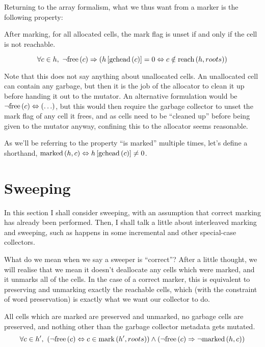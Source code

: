 Returning to the array formalism, what we thus want from a marker is
the following property:

\begin{definition}
  \label{def:ms-correct-marking}
  After marking, for all allocated cells, the mark flag is unset if
  and only if the cell is not reachable.

  \[\forall c \in h,\ \lnot\mathrm{free}\left(c\right) \Rightarrow
  \left(h\left[\mathrm{gchead}\left(c\right)\right] = 0 \Leftrightarrow c \notin
    \mathrm{reach}\left(h, roots\right)\right)\]
\end{definition}

Note that this does not say anything about unallocated cells. An
unallocated cell can contain any garbage, but then it is the job of
the allocator to clean it up before handing it out to the mutator. An
alternative formulation would be $\lnot\mathrm{free}\left(c\right) \Leftrightarrow
\left(\ldots\right)$, but this would then require the garbage
collector to unset the mark flag of any cell it frees, and as cells
need to be ``cleaned up'' before being given to the mutator anyway,
confining this to the allocator seems reasonable.

As we'll be referring to the property ``is marked'' multiple times,
let's define a shorthand, $\mathrm{marked}\left(h, c\right) \Leftrightarrow h\left[\mathrm{gchead}\left(c\right)\right]
\neq 0$.

\section{Sweeping}
\label{sec:marksweep-sweeping}

In this section I shall consider sweeping, with an assumption that
correct marking has already been performed. Then, I shall talk a
little about interleaved marking and sweeping, such as happens in some
incremental and other special-case collectors.

What do we mean when we say a sweeper is ``correct''? After a little
thought, we will realise that we mean it doesn't deallocate any cells
which were marked, and it unmarks all of the cells. In the case of a
correct marker, this is equivalent to preserving and unmarking exactly
the reachable cells, which (with the constraint of word preservation)
is exactly what we want our collector to do.

\begin{definition}
  \label{def:ms-correct-sweeping}
  All cells which are marked are preserved and unmarked, no garbage
  cells are preserved, and nothing other than the garbage collector
  metadata gets mutated.
  \[\forall c \in h',\ \left(\lnot\mathrm{free}\left(c\right) \Leftrightarrow c \in
    \mathrm{mark}\left(h', roots\right)\right) \land \left(\lnot\mathrm{free}\left(c\right) \Rightarrow
    \lnot\mathrm{marked}\left(h, c\right)\right)\]
\end{definition}

